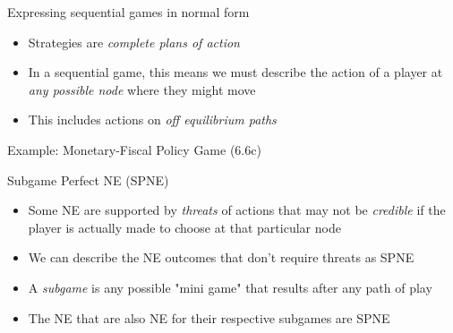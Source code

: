 \documentclass[10pt]{beamer}
\begin{document}
\begin{frame}[label={sec:org1362e67}]{}
\alert{Expressing sequential games in normal form}
\begin{itemize}
\item Strategies are \emph{complete plans of action}
\item In a sequential game, this means we must describe the action of a player at \emph{any possible node} where they might move
\item This includes actions on \emph{off equilibrium paths}
\end{itemize}
\end{frame}

\begin{frame}[label={sec:orgcaabbb4}]{Example: Monetary-Fiscal Policy Game (6.6c)}
\end{frame}

\begin{frame}[label={sec:org80582fe}]{Subgame Perfect NE (SPNE)}
\begin{itemize}
\item Some NE are supported by \emph{threats} of actions that may not be \emph{credible} if the player is actually made to choose at that particular node
\item We can describe the NE outcomes that don't require threats as SPNE
\item A \emph{subgame} is any possible "mini game" that results after any path of play
\item The NE that are also NE for their respective subgames are SPNE
\end{itemize}
\end{frame}
\end{document}

